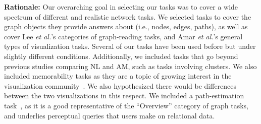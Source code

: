 \vspace{2mm}
\noindent
\textbf{Rationale:} Our overarching goal in selecting our tasks was to cover a wide spectrum of different and realistic network tasks. We selected tasks to cover the graph objects they provide answers about (i.e., nodes, edges, paths), as well as cover Lee {\it et al.}'s categories of graph-reading tasks, and Amar {\it et al.}'s general types of visualization tasks. Several of our tasks have been used before but under slightly different conditions. Additionally, 
we included tasks that go beyond previous studies comparing NL and AM, such as tasks involving clusters. 
We also included memorability tasks as they are a topic of growing interest in the visualization community~\cite{borkin2013makes,Memorability_Saket2015}. We also hypothesized there would be differences between the two visualizations in this respect. 
We included a path-estimation task~\cite{jianu2014display}, as it is a good representative of the ``Overview'' category of graph tasks, and underlies perceptual queries that users make on relational data. 


